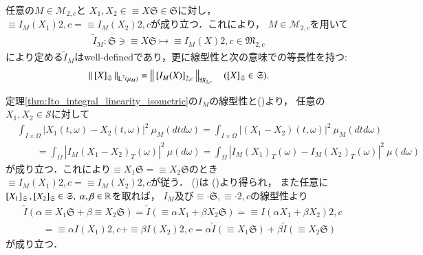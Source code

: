 	\begin{screen}
		\begin{thm}[同値類に対する伊藤積分]
			任意の$M \in \mathcal{M}_{2,c}$と
			$X_1,X_2 \in \equiv{X}{\mathfrak{S}} \in \mathfrak{S}$に対し，
			$\equiv{I_M(X_1)}{2,c} = \equiv{I_M(X_2)}{2,c}$が成り立つ．これにより，
			$M \in \mathcal{M}_{2,c}$を用いて
			\begin{align}
				\tilde{I}_M:\mathfrak{S} \ni \equiv{X}{\mathfrak{S}} \longmapsto \equiv{I_M(X)}{2,c} \in \mathfrak{M}_{2,c}
			\end{align}
			により定める$\tilde{I}_M$はwell-definedであり，更に線型性と次の意味での等長性を持つ:
			\begin{align}
				\left\|\, \left[X\right]_{\mathfrak{S}}\, \right\|_{\operatorname{L}^{2} \left(\mu_M\right)} = \left\|\, \left[I_M(X)\right]_{2,c}\, \right\|_{\mathfrak{M}_{2,c}}
				\quad (\left[X\right]_{\mathfrak{S}} \in \mathfrak{S}).
				\label{eq:thm_Ito_integral_equiv_class_linearity_isometric}
			\end{align}
			\label{thm:Ito_integral_equiv_class_linearity_isometric}
		\end{thm}
	\end{screen}
	
	\begin{prf}
		定理\ref{thm:Ito_integral_linearity_isometric}の$I_M$の線型性と()より，
		任意の$X_1,X_2 \in \mathcal{S}$に対して
		\begin{align}
			&\int_{I \times \Omega} \left| X_1(t,\omega) - X_2(t,\omega) \right|^2\ \mu_M(dtd\omega)
			= \int_{I \times \Omega} \left| (X_1 - X_2)(t,\omega) \right|^2\ \mu_M(dtd\omega) \\
			&\qquad = \int_\Omega \left| I_M(X_1 - X_2)_T(\omega) \right|^2\ \mu(d\omega)
			= \int_\Omega \left| I_M(X_1)_T(\omega) - I_M(X_2)_T(\omega) \right|^2\ \mu(d\omega)
		\end{align}
		が成り立つ．これにより$\equiv{X_1}{\mathfrak{S}} = \equiv{X_2}{\mathfrak{S}}$のとき
		$\equiv{I_M(X_1)}{2,c} = \equiv{I_M(X_2)}{2,c}$が従う．
		()は
		()より得られ，
		また任意に$\left[X_1\right]_{\mathfrak{S}},\left[X_2\right]_{\mathfrak{S}} \in \mathfrak{S},\ \alpha,\beta \in \mathbb{R}$を取れば，
		$I_M$及び$\equiv{\cdot}{\mathfrak{S}},\equiv{\cdot}{2,c}$の線型性より
		\begin{align}
			&\tilde{I}\left( \alpha \equiv{X_1}{\mathfrak{S}} + \beta \equiv{X_2}{\mathfrak{S}} \right)
			= \tilde{I}\left( \equiv{\alpha X_1 + \beta X_2}{\mathfrak{S}} \right)
			= \equiv{I(\alpha X_1 + \beta X_2)}{2,c} \\
			&\qquad = \equiv{\alpha I(X_1)}{2,c} + \equiv{\beta I(X_2)}{2,c}
			= \alpha \tilde{I}\left( \equiv{X_1}{\mathfrak{S}} \right) + \beta \tilde{I}\left( \equiv{X_2}{\mathfrak{S}} \right)
		\end{align}
		が成り立つ．
	\end{prf}
	
